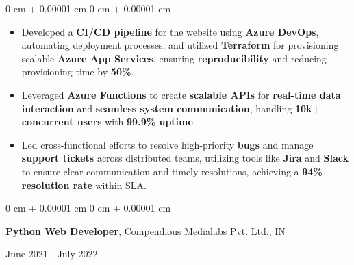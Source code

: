 \documentclass[10pt, letterpaper]{article}
\newenvironment{highlights}{
    \begin{itemize}[
        topsep=0.10 cm,
        parsep=0.10 cm,
        partopsep=0pt,
        itemsep=0pt,
        leftmargin=0 cm + 10pt
    ]
}{
    \end{itemize}
} %
\newenvironment{onecolentry}{
    \begin{adjustwidth}{
        0 cm + 0.00001 cm
    }{
        0 cm + 0.00001 cm
    }
}{
    \end{adjustwidth}
} %
\newenvironment{twocolentry}[2][]{
    \onecolentry
    \def\secondColumn{#2}
    \setcolumnwidth{\fill, 4.5 cm}
    \begin{paracol}{2}
}{
    \switchcolumn \raggedleft \secondColumn
    \end{paracol}
    \endonecolentry
} %
\begin{document}
\begin{onecolentry}
\begin{highlights}
		\item Developed a \textbf{CI/CD pipeline} for the website using \textbf{Azure DevOps}, automating deployment processes, and utilized \textbf{Terraform} for provisioning scalable \textbf{Azure App Services}, ensuring \textbf{reproducibility} and reducing provisioning time by \textbf{50\%}.
		\item Leveraged \textbf{Azure Functions} to create \textbf{scalable APIs} for \textbf{real-time data interaction} and \textbf{seamless system communication}, handling \textbf{10k+ concurrent users} with \textbf{99.9\% uptime}.
		\item Led cross-functional efforts to resolve high-priority \textbf{bugs} and manage \textbf{support tickets} across distributed teams, utilizing tools like \textbf{Jira} and \textbf{Slack} to ensure clear communication and timely resolutions, achieving a \textbf{94\% resolution rate} within SLA.
	\end{highlights}
\end{onecolentry}




\vspace{0.15 cm}
\begin{twocolentry}{
		June 2021 - July-2022
	}
	\textbf{Python Web Developer}, Compendious Medialabs Pvt. Ltd., IN
\end{twocolentry}
\end{document}
